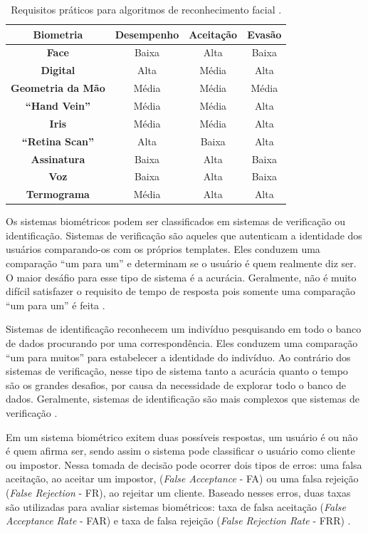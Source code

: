 	\begin{table}[htb]
		\begin{center}
			\caption{Requisitos práticos para algoritmos de reconhecimento facial \cite{milene}.}
			\begin{tabular}{|c|c|c|c|}
				\hline \bf Biometria & \bf Desempenho & \bf Aceitação & \bf Evasão \\
				\hline \hline \bf Face & Baixa & Alta & Baixa\\
				\hline \bf Digital & Alta & Média &  Alta\\
				\hline \bf Geometria da Mão & Média & Média & Média\\
				\hline \bf ``Hand Vein'' & Média & Média & Alta\\
				\hline \bf Iris  & Média & Média & Alta\\
				\hline \bf ``Retina Scan'' & Alta & Baixa & Alta\\
				\hline \bf Assinatura & Baixa & Alta & Baixa \\
				\hline \bf Voz & Baixa & Alta & Baixa \\
				\hline \bf Termograma & Média & Alta & Alta \\
				\hline
			\end{tabular}
		\end{center}
		\label{tabelaRequisitosPraticos}
	\end{table}

Os sistemas biométricos podem ser classificados em sistemas de verificação ou identificação. Sistemas de verificação são aqueles que autenticam a identidade dos usuários comparando-os com os próprios templates. Eles conduzem uma comparação ``um para um'' e determinam se o usuário é quem realmente diz ser. O maior desáfio para esse tipo de sistema é a acurácia. Geralmente, não é muito difícil satisfazer o requisito de tempo de resposta pois somente uma comparação ``um para um'' é feita \cite{hong}.

Sistemas de identificação reconhecem um indivíduo pesquisando em todo o banco de dados procurando por uma correspondência. Eles conduzem uma comparação ``um para muitos'' para estabelecer a identidade do indivíduo. Ao contrário dos sistemas de verificação, nesse tipo de sistema tanto a acurácia quanto o tempo são os grandes desafios, por causa da necessidade de explorar todo o banco de dados. Geralmente, sistemas de identificação são mais complexos que sistemas de verificação \cite{hong}.

Em um sistema biométrico exitem duas possíveis respostas, um usuário é ou não é quem afirma ser, sendo assim o sistema pode classificar o usuário como cliente ou impostor. Nessa tomada de decisão pode ocorrer dois tipos de erros: uma falsa aceitação, ao aceitar um impostor, (\textit{False Acceptance} - FA) ou uma falsa rejeição (\textit{False Rejection} - FR), ao rejeitar um cliente. Baseado nesses erros, duas taxas são utilizadas para avaliar sistemas biométricos: taxa de falsa aceitação (\textit{False Acceptance Rate} - FAR) e taxa de falsa rejeição (\textit{False Rejection Rate} - FRR) \cite{drovetto}.

